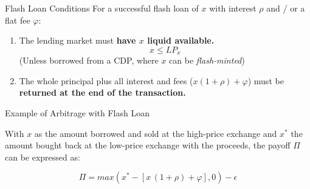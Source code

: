 \documentclass[]{beamer}
\begin{document}
\begin{frame}{Flash Loan Conditions}
For a successful flash loan of $x$ with interest $\rho$  and / or a flat fee $\varphi$:

\vspace{1em}
\begin{enumerate}
	\item The lending market must \textbf{have $x$ liquid available.}\\
	\begin{equation*}
		x \leq LP_{x}
	\end{equation*}
	(Unless borrowed from a CDP, where $x$ can be \textit{flash-minted})
	\item The whole principal plus all interest and fees ($ x(1+\rho) + \varphi$) must be \textbf{returned at the end of the transaction.}
\end{enumerate}


	
\end{frame}


\begin{frame}{Example of Arbitrage with Flash Loan}

With $x$ as the amount borrowed and sold at the high-price exchange and $x^\ast$ the amount bought back at the low-price exchange with the proceeds, the payoff $\Pi$ can be expressed as:

\begin{equation*}
	\Pi = max (x^{\ast}-[x \,(1+\rho) + \varphi ],0) - \epsilon
\end{equation*}

\vspace{0.5 em}

	
\end{frame}
\end{document}
